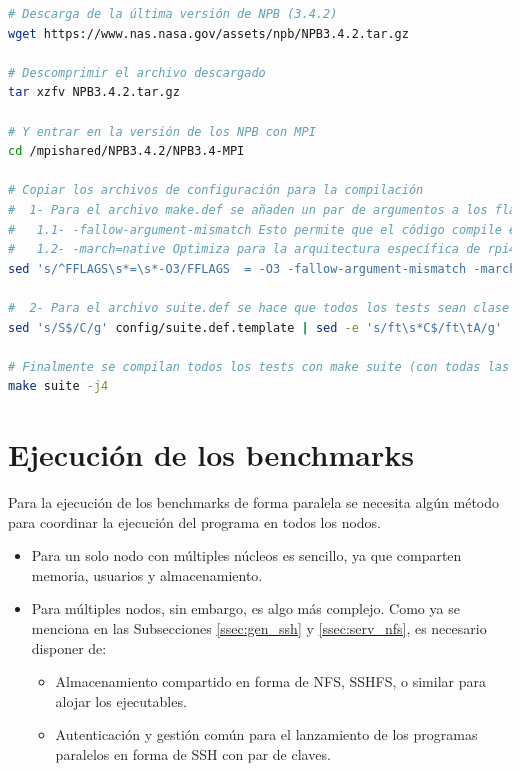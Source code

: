 \begin{lstlisting}[language=bash]
# Descarga de la última versión de NPB (3.4.2)
wget https://www.nas.nasa.gov/assets/npb/NPB3.4.2.tar.gz

# Descomprimir el archivo descargado
tar xzfv NPB3.4.2.tar.gz

# Y entrar en la versión de los NPB con MPI
cd /mpishared/NPB3.4.2/NPB3.4-MPI

# Copiar los archivos de configuración para la compilación
#  1- Para el archivo make.def se añaden un par de argumentos a los flags de compilación:
#   1.1- -fallow-argument-mismatch Esto permite que el código compile en las últimas versiones de gfortran
#   1.2- -march=native Optimiza para la arquitectura específica de rpi4
sed 's/^FFLAGS\s*=\s*-O3/FFLAGS  = -O3 -fallow-argument-mismatch -march=native/g' config/make.def.template | sed -e 's/^CFLAGS\s*=\s*-O3/CFLAGS  = -O3 -march=native/g' > config/make.def

#  2- Para el archivo suite.def se hace que todos los tests sean clase C menos FT, que por razones de memoria es clase A, y MG clase B, por los mismos motivos.
sed 's/S$/C/g' config/suite.def.template | sed -e 's/ft\s*C$/ft\tA/g' | sed -e 's/mg\s*C$/mg\tB/g' > config/suite.def

# Finalmente se compilan todos los tests con make suite (con todas las CPU en paralelo)
make suite -j4
\end{lstlisting}

\section{Ejecución de los benchmarks}
Para la ejecución de los benchmarks de forma paralela se necesita algún método para coordinar la ejecución del programa en todos los nodos.

\begin{itemize}
    \item Para un solo nodo con múltiples núcleos es sencillo, ya que comparten memoria, usuarios y almacenamiento.
    \item Para múltiples nodos, sin embargo, es algo más complejo. Como ya se menciona en las Subsecciones \ref{ssec:gen_ssh} y \ref{ssec:serv_nfs}, es necesario disponer de:
    \begin{itemize}
        \item Almacenamiento compartido en forma de NFS, SSHFS, o similar para alojar los ejecutables.
        \item Autenticación y gestión común para el lanzamiento de los programas paralelos en forma de SSH con par de claves.
    \end{itemize}
\end{itemize}

